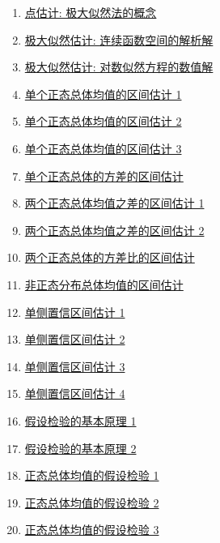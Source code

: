 \documentclass[11pt]{article}
\begin{document}
\begin{multicols}{2}
\begin{enumerate}
		\item \href{https://mp.weixin.qq.com/s/zO2c0mKLE35spxmBGVDDcQ}{点估计: 极大似然法的概念}	%
		\item \href{https://mp.weixin.qq.com/s/wtPo6CFWEeLE_-y2LYOElQ}{极大似然估计: 连续函数空间的解析解}	%
		\item \href{https://mp.weixin.qq.com/s/teyXnzMMS94uSqUGYHnZcQ}{极大似然估计: 对数似然方程的数值解}	%
		\item \href{https://mp.weixin.qq.com/s/drj8TkgcU6g7Xst414ugQg}{单个正态总体均值的区间估计 1}	%
		\item \href{https://mp.weixin.qq.com/s/Bg0xb_NN-4td-v5fLibHHw}{单个正态总体均值的区间估计 2}	%
		\item \href{https://mp.weixin.qq.com/s/itDS7eTdn_nSX0_FPRQVpw}{单个正态总体均值的区间估计 3}	%
		\item \href{https://mp.weixin.qq.com/s/RZPKDwXN_vjZXJL7DeLG1Q}{单个正态总体的方差的区间估计}	%
		\item \href{https://mp.weixin.qq.com/s/VTWRsvaTlievKRdl4biMHQ}{两个正态总体均值之差的区间估计 1}	%
		\item \href{https://mp.weixin.qq.com/s/OlsJjPml-Qlk9Lvy1U2s_A}{两个正态总体均值之差的区间估计 2}	%
		\item \href{https://mp.weixin.qq.com/s/BlyABZmDR2-F36aEfHz_QA}{两个正态总体的方差比的区间估计}	%
		\item \href{https://mp.weixin.qq.com/s/GECAEr3hsPSERo-R-CpIxw}{非正态分布总体均值的区间估计}	%
		\item \href{https://mp.weixin.qq.com/s/6k4OlmOwt3GXbUTNCMABpw}{单侧置信区间估计 1}	%
		\item \href{https://mp.weixin.qq.com/s/Ppv7qJNEpDQpKeruu9BVYw}{单侧置信区间估计 2}	%
		\item \href{https://mp.weixin.qq.com/s/4LFB-ugqzALSsOuwPYIxWw}{单侧置信区间估计 3}	%
		\item \href{https://mp.weixin.qq.com/s/5GUQNpdD2fCanH_QsrEv6A}{单侧置信区间估计 4}	%
		\item \href{https://mp.weixin.qq.com/s/1s6o5bTvYpkwvmpj1v6byA}{假设检验的基本原理 1}	%
		\item \href{https://mp.weixin.qq.com/s/uFAevuhlh-IozPaldmIqsA}{假设检验的基本原理 2}	%
		\item \href{https://mp.weixin.qq.com/s/oKpUapIcUYGTRCBIyP5d2g}{正态总体均值的假设检验 1}	%
		\item \href{https://mp.weixin.qq.com/s/TVhsUofZKPcSB0pC5GfhcQ}{正态总体均值的假设检验 2}	%
		\item \href{https://mp.weixin.qq.com/s/krOGj-lWhaktc4XO_IE7ww}{正态总体均值的假设检验 3}	%

\end{enumerate}
\end{multicols}
\end{document}
